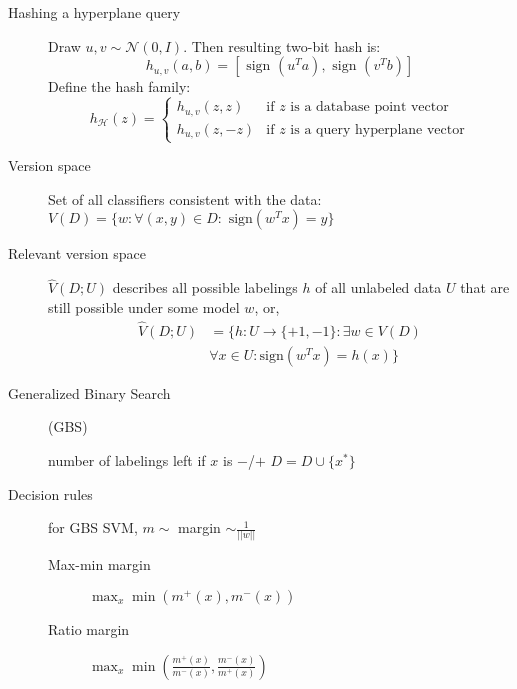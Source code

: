 \documentclass[11pt,landscape]{article}
\begin{document}
\begin{multicols}{3}
\begin{description}
    \item[Hashing a hyperplane query] Draw $u,v \sim \mathcal{N}(0,I)$. Then resulting two-bit hash is:
    $$ h_{u,v}(a,b) = \left [ \text{ sign }(u^T a),\text{ sign }(v^T b) \right ]$$
    Define the hash family:
    $$
    h_{\mathcal{H}}(z) = \begin{cases}
        h_{u,v} (z,z) & \text{if $z$ is a database point vector} \\
        h_{u,v} (z,-z) & \text{if $z$ is a query hyperplane vector}
    \end{cases}$$
    \item[Version space] Set of all classifiers consistent with the data:
        $V(D) = \{w : \forall (x,y) \in D : \text{ sign}(w^T x) = y \}$
    \item[Relevant version space] $\hat{V}(D;U)$ describes all possible labelings $h$ of all unlabeled data $U$ that are still possible under some model $w$, or,
    \begin{align*}
        \hat{V}(D;U) &= \{h: U \rightarrow  \{+1,-1\}  : \exists w  \in V(D)\\
        &\forall x \in U : \text{sign}(w^T x) = h(x) \}
    \end{align*}
\item[Generalized Binary Search] (GBS)\\
    \begin{algorithmic}[1]
                \State \Comment number of labelings left if $x$ is $-$/$+$
            \EndFor
            \State $D = D \cup \{x^\ast\}$
        \EndWhile
    \end{algorithmic}
\item[Decision rules] for GBS SVM, $m \sim$ margin $\sim \frac{1}{||w||}$\\
    \begin{description}
        \item[Max-min margin] $\max_x \min \left( m^+(x),m^-(x) \right)$
        \item[Ratio margin] $\max_x \min \left (\frac{m^+(x)}{m^-(x)},\frac{m^-(x)}{m^+(x)} \right)$
    \end{description}
\end{description}


\end{multicols}
\end{document}

